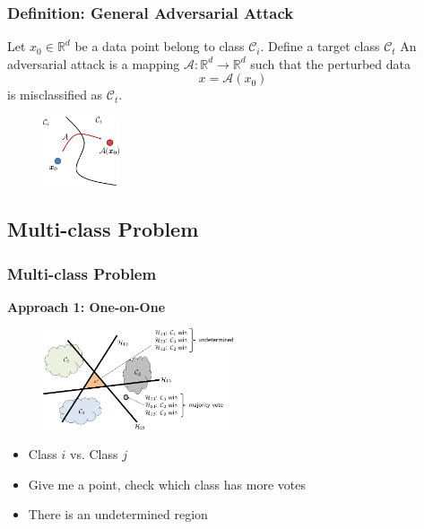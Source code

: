 \documentclass[8pt,dvipsnames]{beamer}
\newenvironment{customtheorem}[1]
{%
	\tcolorbox[
	enhanced,
	colback=blue!5,
	colframe=blue!60!black,
	coltitle=black,
	colbacktitle=blue!5,
	fonttitle=\bfseries,
	attach boxed title to top left={yshift=-2mm, xshift=2mm},
	boxed title style={sharp corners},
	sharp corners,
	title=#1
	]
}
{%
	\endtcolorbox
}
\begin{document}
\begin{frame}
	\frametitle{Definition: General Adversarial Attack}
	\begin{customtheorem}{General Adversarial Attack}
		Let \(x_{0} \in \mathbb{R}^{d}\) be a data point belong to class \(\mathcal{C}_{i}\). Define a target class \(\mathcal{C}_{t}\)
		An adversarial attack is a mapping \(\mathcal{A}: \mathbb{R}^{d} \rightarrow \mathbb{R}^{d}\) such that the
		perturbed data
		$$
		x=\mathcal{A}\left(x_{0}\right)
		$$
		is misclassified as \(\mathcal{C}_{t}\).
	\end{customtheorem}
		\begin{figure}[htbp]
		\centering
		\includegraphics[width=0.2\textwidth]{imgs/adv_overview_10.png}
	\end{figure}
\end{frame}

\subsection{Multi-class Problem}
\begin{frame}
	\frametitle{Multi-class Problem}
	\textbf{Approach 1: One-on-One}
			\begin{figure}[htbp]
		\centering
		\includegraphics[width=0.5\textwidth]{imgs/adv_overview_11.png}
	\end{figure}
	\begin{itemize}
		\item Class $i$ vs. Class $j$
		\item Give me a point, check which class has more votes
		\item There is an undetermined region
	\end{itemize}
\end{frame}
\end{document}
